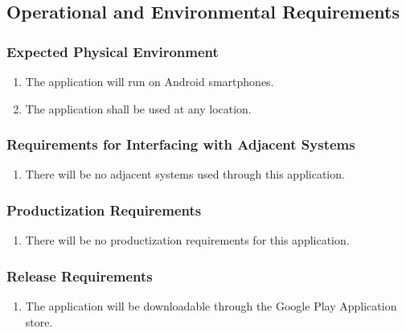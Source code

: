 \documentclass[12pt, titlepage]{article}
\begin{document}

\subsection{Operational and Environmental Requirements}
\label{sub:operational_and_environmental_requirements}

\subsubsection{Expected Physical Environment}
\label{ssub:expected_physical_environment}
\begin{enumerate}[{OE}1. ]
	\item The application will run on Android smartphones.
	\item The application shall be used at any location.
\end{enumerate}

\subsubsection{Requirements for Interfacing with Adjacent Systems}
\label{ssub:requirements_for_interfacing_with_adjacent_systems}
\begin{enumerate}[{OE}1. ]
	\item There will be no adjacent systems used through this application.
\end{enumerate}

\subsubsection{Productization Requirements}
\label{ssub:productization_requirements}
\begin{enumerate}[{OE}1. ]
	\item There will be no productization requirements for this application.
\end{enumerate}

\subsubsection{Release Requirements}
\label{ssub:release_requirements}
\begin{enumerate}[{OE}1. ]
	\item The application will be downloadable through the Google Play Application store.
\end{enumerate}
\end{document}
